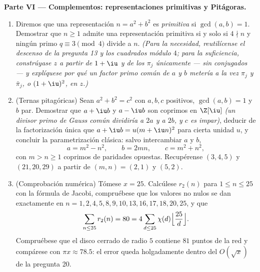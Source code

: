 \begin{problem}
\medskip
\noindent\textbf{Parte VI --- Complementos: representaciones primitivas
y Pitágoras.}
\begin{enumerate}[resume]
  \item Diremos que una representación $n = a^2 + b^2$ es
  \emph{primitiva} si $\gcd(a, b) = 1$. Demostrar que $n \geq 1$ admite
  una representación primitiva si y solo si $4 \nmid n$ y ningún primo
  $q \equiv 3 \pmod 4$ divide a $n$. \emph{(Para la necesidad,
  reutilícense el descenso de la pregunta 13 y los cuadrados módulo $4$;
  para la suficiencia, constrúyase $z$ a partir de $1 + \iu$ y de los
  $\pi_j$ únicamente --- sin conjugados --- y explíquese por qué un
  factor primo común de $a$ y $b$ metería a la vez $\pi_j$ y
  $\bar\pi_j$, o $(1+\iu)^2$, en
        $z$.)}
  \item (Ternas pitagóricas) Sean $a^2 + b^2 = c^2$ con $a, b,
        c$ positivos, $\gcd(a, b) = 1$ y $b$ par. Demostrar que
  $a + \iu b$ y $a - \iu b$ son coprimos en $\Z[\iu]$ \emph{(un divisor
  primo de Gauss común dividiría a $2a$ y a $2b$, y $c$ es impar)},
  deducir de la factorización única que $a + \iu b = u(m + \iu n)^2$
  para cierta unidad $u$, y concluir la parametrización clásica: salvo
  intercambiar $a$ y $b$,
        \[
        a = m^2 - n^2, \qquad b = 2mn, \qquad c = m^2 + n^2,
        \]
        con $m > n \geq 1$ coprimos de paridades opuestas. Recupérense
        $(3, 4, 5)$ y $(21, 20, 29)$ a partir de $(m, n) =
        (2, 1)$ y $(5, 2)$. \item (Comprobación numérica) Tómese
        $x = 25$. Calcúlese $r_2(n)$ para $1 \leq n \leq 25$ con la
        fórmula de Jacobi, compruébese que los valores no nulos se dan
        exactamente en $n = 1,
        2, 4, 5, 8, 9, 10, 13, 16, 17, 18, 20, 25$, y que
        \[
        \sum_{n \leq 25} r_2(n) = 80
        = 4\sum_{d \leq 25}\chi(d)
        \Bigl\lfloor\frac{25}d\Bigr\rfloor .
        \]
        Compruébese que el disco cerrado de radio $5$ contiene $81$
        puntos de la red y compárese con $\pi x \approx 78.5$: el error
        queda holgadamente dentro del $O(\sqrt x)$ de la pregunta
        20.
\end{enumerate}
\end{problem}

